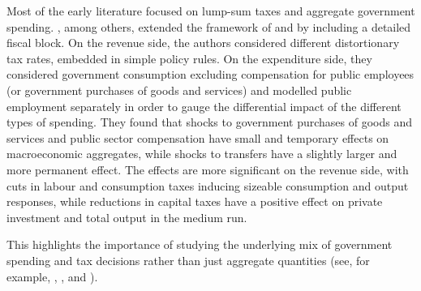 \documentclass[a4paper,11pt]{article}
\numberwithin{equation}{section}
\begin{document}
	Most of the early literature focused on lump-sum taxes and aggregate government spending. \cite{forni2009}, among others, extended the framework of \cite{christiano2005} and \cite{gali} by including a detailed fiscal block. On the revenue side, the authors considered different distortionary tax rates, embedded in simple policy rules. On the expenditure side, they considered government consumption excluding compensation for public employees (or government purchases of goods and services) and modelled public employment separately in order to gauge the differential impact of the different types of spending. They found that shocks to government purchases of goods and services and public sector compensation have small and temporary effects on macroeconomic aggregates, while shocks to transfers have a slightly larger and more permanent effect. The effects are more significant on the revenue side, with cuts in labour and consumption taxes inducing sizeable consumption and output responses, while reductions in capital taxes have a positive effect on private investment and total output in the medium run. 
	
	This highlights the importance of studying the underlying mix of government spending and tax decisions rather than just aggregate quantities (see, for example, \cite{mountford}, \cite{carvalho2011}, and \cite{coenen2012}).
	
	
\end{document}
